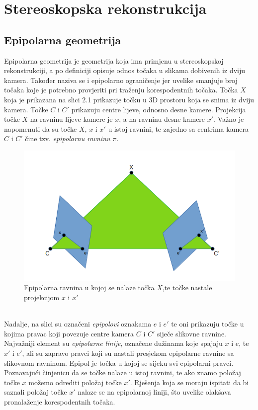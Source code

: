 \documentclass[times, utf8, zavrsni]{fer}
\begin{document}
\chapter{Stereoskopska rekonstrukcija}
\section{Epipolarna geometrija}
Epipolarna geometrija je geometrija koja ima primjenu u stereoskopskoj rekonstrukciji, a po definiciji opisuje odnos točaka u slikama dobivenih iz dviju kamera. Također naziva se i epipolarno ograničenje jer uvelike smanjuje broj točaka koje je potrebno provjeriti pri traženju korespodentnih točaka. Točka $X$ koja je prikazana na slici 2.1 prikazuje točku u 3D prostoru koja se snima iz dviju kamera. Točke $C$ i $C'$ prikazuju centre lijeve, odnosno desne kamere. Projekcija točke $X$ na ravninu lijeve kamere je $x$, a na ravninu desne kamere $x'$. Važno je napomenuti da su točke $X$, $x$ i $x'$ u istoj ravnini, te zajedno sa centrima kamera $C$ i $C'$ čine tzv. \textit{epipolarnu ravninu} $\pi$.\\
\begin{figure}[htb]
\centering
\includegraphics[scale=0.46]{img/slika1.png}
\caption{Epipolarna ravnina u kojoj se nalaze točka $X$,te točke nastale projekcijom $x$ i $x'$}
\label{fig:Epipolar}
\end{figure}\\
Nadalje, na slici su označeni \textit{epipolovi} oznakama $e$ i $e'$ te oni prikazuju točke u kojima pravac koji povezuje centre kamera $C$ i $C'$ siječe slikovne ravnine.
Najvažniji element su \textit{epipolarne linije}, označene dužinama koje spajaju $x$ i $e$, te $x'$ i $e'$, ali su zapravo pravci koji su nastali presjekom epipolarne ravnine sa slikovnom ravninom. Epipol je točka u kojoj se sijeku svi epipolarni pravci.\\
Poznavajući činjenicu da se točke nalaze u istoj ravnini, te ako znamo položaj točke $x$ možemo odrediti položaj točke $x'$. Rješenja koja se moraju ispitati da bi saznali položaj točke $x'$ nalaze se na epipolarnoj liniji, što uvelike olakšava pronalaženje korespodentnih točaka.
\end{document}
